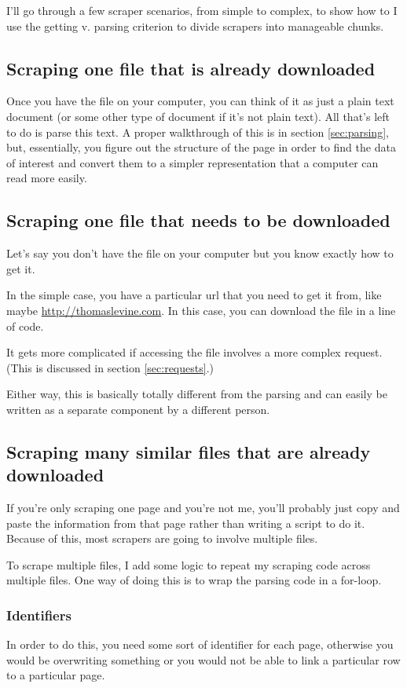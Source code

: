 \documentclass{article}
\begin{document}
I'll go through a few scraper scenarios, from simple to complex, to
show how to I use the getting v. parsing criterion to divide scrapers
into manageable chunks.

\subsection{Scraping one file that is already downloaded}
Once you have the file on your computer, you can think of it as
just a plain text document (or some other type of document if it's
not plain text). All that's left to do is parse this text.
A proper walkthrough of this is in section \ref{sec:parsing},
but, essentially, you figure out the structure of the page in order
to find the data of interest and convert them to a simpler
representation that a computer can read more easily.

\subsection{Scraping one file that needs to be downloaded}
Let's say you don't have the file on your computer but you know
exactly how to get it.

In the simple case, you have a particular url that you need
to get it from, like maybe \url{http://thomaslevine.com}.
In this case, you can download the file in a line of code.

It gets more complicated if accessing the file involves a
more complex request. (This is discussed in section
\ref{sec:requests}.)

Either way, this is basically totally different from the parsing
and can easily be written as a separate component by a different person.

\subsection{Scraping many similar files that are already downloaded}
If you're only scraping one page and you're not me, you'll probably just
copy and paste the information from that page rather than writing
a script to do it. Because of this, most scrapers are going to involve
multiple files.

To scrape multiple files, I add some logic to repeat my scraping code
across multiple files. One way of doing this is to wrap the parsing
code in a for-loop.

\subsubsection{Identifiers}
In order to do this, you need some sort of identifier for each page,
otherwise you would be overwriting something or you would not be able
to link a particular row to a particular page.
\end{document}
